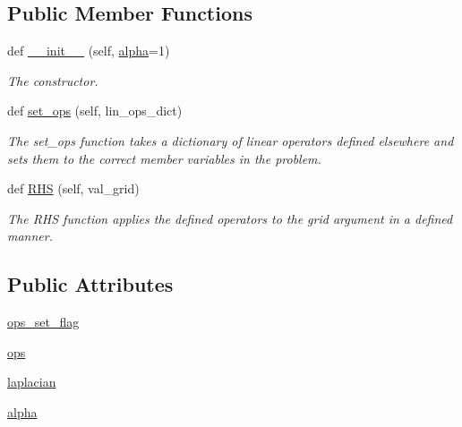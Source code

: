 \subsection*{Public Member Functions}
\begin{DoxyCompactItemize}
\item 
def \hyperlink{classMain__PDE__Repo_1_1src_1_1conduct__heat__eqn_1_1ConductHeatEqn_aa17c55ed50c88c1c70811b23467a66bd}{\+\_\+\+\_\+init\+\_\+\+\_\+} (self, \hyperlink{classMain__PDE__Repo_1_1src_1_1conduct__heat__eqn_1_1ConductHeatEqn_abd7a28d699a29f455f2be1c6a8620345}{alpha}=1)
\begin{DoxyCompactList}\small\item\em The constructor. \end{DoxyCompactList}\item 
def \hyperlink{classMain__PDE__Repo_1_1src_1_1conduct__heat__eqn_1_1ConductHeatEqn_a9733763f77bf263a466bb08effec78ab}{set\+\_\+ops} (self, lin\+\_\+ops\+\_\+dict)
\begin{DoxyCompactList}\small\item\em The set\+\_\+ops function takes a dictionary of linear operators defined elsewhere and sets them to the correct member variables in the problem. \end{DoxyCompactList}\item 
def \hyperlink{classMain__PDE__Repo_1_1src_1_1conduct__heat__eqn_1_1ConductHeatEqn_a5889ab024d0a42bf84a00c1c156a19a9}{R\+HS} (self, val\+\_\+grid)
\begin{DoxyCompactList}\small\item\em The R\+HS function applies the defined operators to the grid argument in a defined manner. \end{DoxyCompactList}\end{DoxyCompactItemize}
\subsection*{Public Attributes}
\begin{DoxyCompactItemize}
\item 
\hyperlink{classMain__PDE__Repo_1_1src_1_1conduct__heat__eqn_1_1ConductHeatEqn_ab59c6cb80b17b0e0b17e64dffc341ec5}{ops\+\_\+set\+\_\+flag}
\item 
\hyperlink{classMain__PDE__Repo_1_1src_1_1conduct__heat__eqn_1_1ConductHeatEqn_a37601e4988c38b8a9a7f5d60867b528c}{ops}
\item 
\hyperlink{classMain__PDE__Repo_1_1src_1_1conduct__heat__eqn_1_1ConductHeatEqn_a3db974e4df85f88ce996026771f915cc}{laplacian}
\item 
\hyperlink{classMain__PDE__Repo_1_1src_1_1conduct__heat__eqn_1_1ConductHeatEqn_abd7a28d699a29f455f2be1c6a8620345}{alpha}
\end{DoxyCompactItemize}


